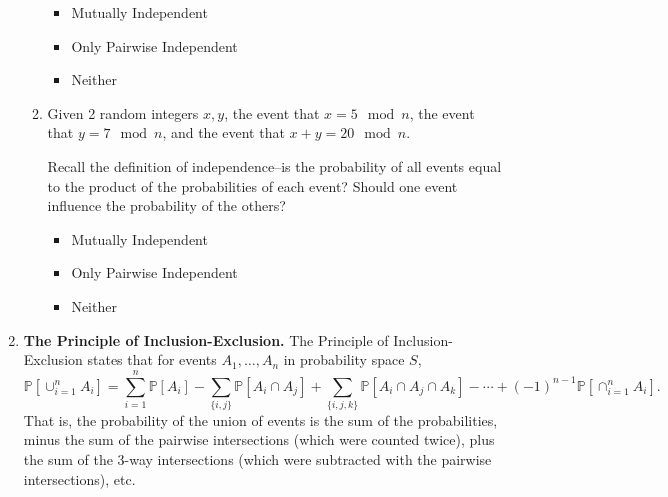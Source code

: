 \documentclass[11pt, preview]{standalone} %
\newcommand{\Prob}{\mathbb{P}}
\begin{document}
\begin{enumerate}
\begin{enumerate}
\begin{Multi}
\begin{itemize}
\TrueChoice\item Mutually Independent
\FalseChoice\item Only Pairwise Independent
\FalseChoice\item Neither
\end{itemize}
\end{Multi}
\item Given 2 random integers $x,y$, the event that $x = 5 \mod n$, the event that $y = 7 \mod n$, and the event that $x + y = 20 \mod n$. 
\begin{Multi}
Recall the definition of independence--is the probability of all events equal to the product of the probabilities of each event? Should one event influence the probability of the others?
\begin{itemize}
\FalseChoice\item Mutually Independent
\TrueChoice\item Only Pairwise Independent
\FalseChoice\item Neither
\end{itemize}
\end{Multi}
\end{enumerate}
\item {\bf The Principle of Inclusion-Exclusion.} The Principle of Inclusion-Exclusion states that for events $A_1, \ldots, A_n$ in probability space $S$,
\[
\Prob[\cup_{i = 1}^n A_i] = \sum_{i = 1}^n \Prob[A_i] - \sum_{\{i,j\}} \Prob[A_i \cap A_j] + \sum_{\{i,j,k\}} \Prob[A_i \cap A_j \cap A_k] - \cdots + (-1)^{n-1}\Prob[\cap_{i=1}^n A_i].
\]
That is, the probability of the union of events is the sum of the probabilities, minus the sum of the pairwise intersections (which were counted twice), plus the sum of the 3-way intersections (which were subtracted with the pairwise intersections), etc.


\end{enumerate}
\end{document}
